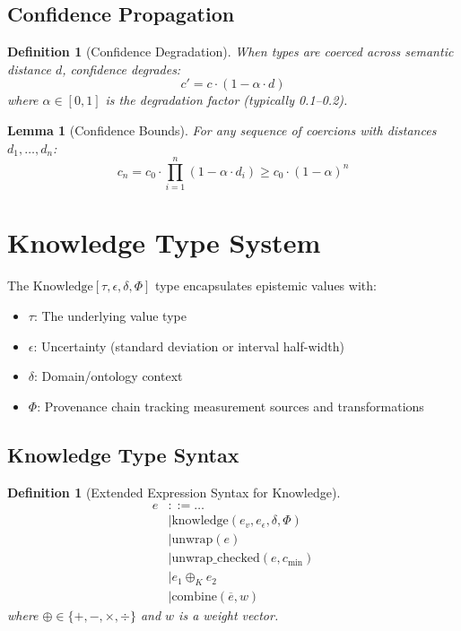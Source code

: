 \documentclass{article}
\newtheorem{lemma}[theorem]{Lemma}
\newtheorem{definition}[theorem]{Definition}
\begin{document}
\subsection{Confidence Propagation}

\begin{definition}[Confidence Degradation]
When types are coerced across semantic distance $d$, confidence degrades:
\[
c' = c \cdot (1 - \alpha \cdot d)
\]
where $\alpha \in [0, 1]$ is the degradation factor (typically 0.1--0.2).
\end{definition}

\begin{lemma}[Confidence Bounds]
For any sequence of coercions with distances $d_1, \ldots, d_n$:
\[
c_n = c_0 \cdot \prod_{i=1}^{n} (1 - \alpha \cdot d_i) \geq c_0 \cdot (1 - \alpha)^n
\]
\end{lemma}

\section{Knowledge Type System}

The $\text{Knowledge}[\tau, \epsilon, \delta, \Phi]$ type encapsulates epistemic values with:
\begin{itemize}
\item $\tau$: The underlying value type
\item $\epsilon$: Uncertainty (standard deviation or interval half-width)
\item $\delta$: Domain/ontology context
\item $\Phi$: Provenance chain tracking measurement sources and transformations
\end{itemize}

\subsection{Knowledge Type Syntax}

\begin{definition}[Extended Expression Syntax for Knowledge]
\begin{align*}
e &::= \ldots \\
  &\mid \text{knowledge}(e_v, e_\epsilon, \delta, \Phi) \tag{Introduction} \\
  &\mid \text{unwrap}(e) \tag{Elimination} \\
  &\mid \text{unwrap\_checked}(e, c_{\min}) \tag{Checked Elimination} \\
  &\mid e_1 \oplus_K e_2 \tag{Binary Operations} \\
  &\mid \text{combine}(\overline{e}, w) \tag{Fusion}
\end{align*}
where $\oplus \in \{+, -, \times, \div\}$ and $w$ is a weight vector.
\end{definition}
\end{document}

